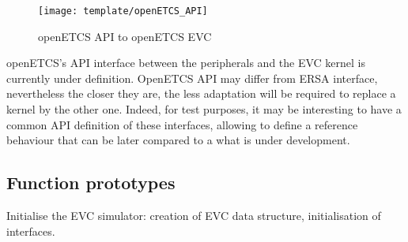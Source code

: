 \documentclass{template/openetcs_article}
\begin{document}
\newpage

\begin{figure}[!h]
  \centering
  \texttt{[image: template/openETCS\_API]}
  \caption{openETCS API to openETCS EVC}
  \label{fig:openETCS API to openETCS EVC}
\end{figure}
openETCS's API interface between the peripherals and the EVC kernel is currently under definition. OpenETCS API may differ from ERSA interface, nevertheless the closer they are, the less adaptation will be required to replace a kernel by the other one. Indeed, for test purposes, it may be interesting to have a common API definition of these interfaces, allowing to define a reference behaviour that can be later compared to a what is under development.
\subsection{Function prototypes}
Initialise the EVC simulator: creation of EVC data structure, initialisation of interfaces.
\end{document}
